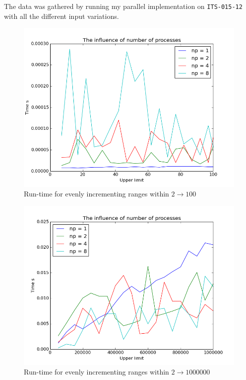 \documentclass[paper=a4, fontsize=11pt]{scrartcl} %
\numberwithin{equation}{section} %
\numberwithin{figure}{section} %
\numberwithin{table}{section} %
\begin{document}
The data was gathered by running my parallel implementation on \texttt{ITS-015-12} with all the different input variations.

\begin{figure}[H]
    \centering
    \includegraphics[width=\linewidth]{low.png}
    \caption{Run-time for evenly incrementing ranges within $2 \rightarrow 100$} \label{fig:low}
\end{figure}

\begin{figure}[H]
    \centering
    \includegraphics[width=\linewidth]{med.png}
    \caption{Run-time for evenly incrementing ranges within $2 \rightarrow 1000000$} \label{fig:med}
\end{figure}
\end{document}
